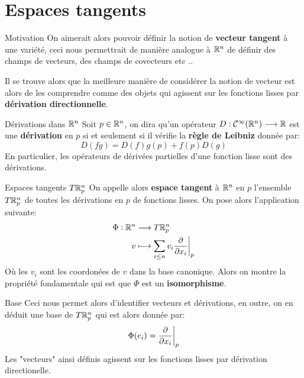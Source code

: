 \documentclass{beamer}
\begin{document}
    \section{Espaces tangents}
        \begin{frame}{Motivation}
            On aimerait alors pouvoir définir la notion de \textbf{vecteur tangent} à une variété, ceci nous permettrait de manière analogue à $\mathbb{R}^n$ de définir des champs de vecteurs, des champs de covecteurs etc ..\<

            Il se trouve alors que la meilleure manière de considérer la notion de vecteur est alors de les comprendre comme des objets qui agissent sur les fonctions lisses par \textbf{dérivation directionnelle}. 
        \end{frame}
        \begin{frame}{Dérivations dans $\mathbb{R}^n$}
            Soit \(p \in \mathbb{R}^n\), on dira qu'un opérateur \( D: \mathcal{C}^\infty(\mathbb{R}^n) \longrightarrow \mathbb{R} \) est une \textbf{dérivation} en \( p \) si et seulement si il vérifie la \textbf{règle de Leibniz} donnée par:
            \[ 
               D(fg) = D(f)g(p) + f(p)D(g) 
            \]
            En particulier, les opérateurs de dérivées partielles d'une fonction lisse sont des dérivations.
        \end{frame}
        \begin{frame}{Espaces tangents $T\mathbb{R}^n_p$}
            On appelle alors \textbf{espace tangent} à \( \mathbb{R}^n \) en \( p \) l'ensemble \( T\mathbb{R}^n_p \) de toutes les dérivations en \( p \) de fonctions lisses. On pose alors l'application suivante:
            \[ 
               \begin{aligned}
                  \Phi : \mathbb{R}^n &\longrightarrow T\mathbb{R}^n_p \\
                  v &\longmapsto \sum_{i \leq n} v_i \frac{\partial }{\partial x_i}\biggr|_p
               \end{aligned} 
            \]
            Où les \( v_i \) sont les coordonées de \( v \) dans la base canonique. Alors on montre la propriété fondamentale qui est que \( \Phi \) est un \textbf{isomorphisme}.
        \end{frame}
        \begin{frame}{Base}
            Ceci nous permet alors d'identifier vecteurs et dérivations, en outre, on en déduit une base de \( T\mathbb{R}^n_p \) qui est alors donnée par:
            \[ 
               \Phi(e_i) = \frac{\partial }{\partial x_i}\biggr|_p
            \] 
            Les "vecteurs" ainsi définis agissent sur les fonctions lisses par dérivation directionelle.
        \end{frame}
\end{document}

